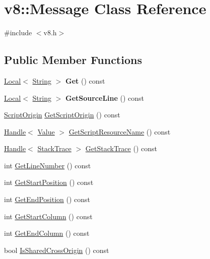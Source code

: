 \hypertarget{classv8_1_1Message}{}\section{v8\+:\+:Message Class Reference}
\label{classv8_1_1Message}


{\ttfamily \#include $<$v8.\+h$>$}

\subsection*{Public Member Functions}
\begin{DoxyCompactItemize}
\item 
\hypertarget{classv8_1_1Message_a72f26c7b684bbfbd14d5970849fdf3d2}{}\hyperlink{classv8_1_1Local}{Local}$<$ \hyperlink{classv8_1_1String}{String} $>$ {\bfseries Get} () const \label{classv8_1_1Message_a72f26c7b684bbfbd14d5970849fdf3d2}

\item 
\hypertarget{classv8_1_1Message_a0d5cceb5128a147818c72b82950e475d}{}\hyperlink{classv8_1_1Local}{Local}$<$ \hyperlink{classv8_1_1String}{String} $>$ {\bfseries Get\+Source\+Line} () const \label{classv8_1_1Message_a0d5cceb5128a147818c72b82950e475d}

\item 
\hyperlink{classv8_1_1ScriptOrigin}{Script\+Origin} \hyperlink{classv8_1_1Message_ae0fc442f44bd2b600c4d89a50cf3abd9}{Get\+Script\+Origin} () const 
\item 
\hyperlink{classv8_1_1Handle}{Handle}$<$ \hyperlink{classv8_1_1Value}{Value} $>$ \hyperlink{classv8_1_1Message_ac5d31afb758897cd1653c5eb3327a4d6}{Get\+Script\+Resource\+Name} () const 
\item 
\hyperlink{classv8_1_1Handle}{Handle}$<$ \hyperlink{classv8_1_1StackTrace}{Stack\+Trace} $>$ \hyperlink{classv8_1_1Message_adeffa297a5a28955dd16c084632aa645}{Get\+Stack\+Trace} () const 
\item 
int \hyperlink{classv8_1_1Message_a67f97fd76b8f98ed65743b9615d64a79}{Get\+Line\+Number} () const 
\item 
int \hyperlink{classv8_1_1Message_a31a550a1d3d09a2d72d0742be821956f}{Get\+Start\+Position} () const 
\item 
int \hyperlink{classv8_1_1Message_a50cbec87379e628b1647466926882037}{Get\+End\+Position} () const 
\item 
int \hyperlink{classv8_1_1Message_aab8007ba81d3f195280bce0693810cc2}{Get\+Start\+Column} () const 
\item 
int \hyperlink{classv8_1_1Message_aaf82cd7f7449add5f50d4253499cad05}{Get\+End\+Column} () const 
\item 
bool \hyperlink{classv8_1_1Message_a03228f50c40c45da52f424bdd64598d1}{Is\+Shared\+Cross\+Origin} () const 
\end{DoxyCompactItemize}
